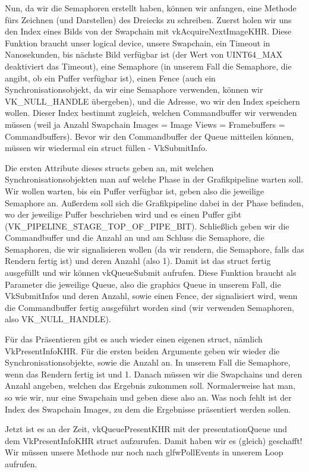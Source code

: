 \documentclass[11pt,a4paper]{report}
\begin{document}
Nun, da wir die Semaphoren erstellt haben, können wir anfangen, eine Methode fürs Zeichnen (und Darstellen) des Dreiecks zu schreiben. Zuerst holen wir uns den Index eines Bilds von der Swapchain mit vkAcquireNextImageKHR. Diese Funktion braucht unser logical device, unsere Swapchain, ein Timeout in Nanosekunden, bis nächste Bild verfügbar ist (der Wert von UINT64\_MAX deaktiviert das Timeout), eine Semaphore (in unserem Fall die Semaphore, die angibt, ob ein Puffer verfügbar ist), einen Fence (auch ein Synchronisationsobjekt, da wir eine Semaphore verwenden, können wir VK\_NULL\_HANDLE übergeben), und die Adresse, wo wir den Index speichern wollen. Dieser Index bestimmt zugleich, welchen Commandbuffer wir verwenden müssen (weil ja Anzahl Swapchain Images = Image Views = Framebuffers = Commandbuffers). Bevor wir den Commandbuffer der Queue mitteilen können, müssen wir wiedermal ein struct füllen - VkSubmitInfo.

Die ersten Attribute dieses structs geben an, mit welchen Synchronisationsobjekten man auf welche Phase in der Grafikpipeline warten soll. Wir wollen warten, bis ein Puffer verfügbar ist, geben also die jeweilige Semaphore an. Außerdem soll sich die Grafikpipeline dabei in der Phase befinden, wo der jeweilige Puffer beschrieben wird und es einen Puffer gibt (VK\_PIPELINE\_STAGE\_TOP\_OF\_PIPE\_BIT). Schließlich geben wir die Commandbuffer und die Anzahl an und am Schluss die Semaphore, die Semaphoren, die wir signalisieren wollen (da wir rendern, die Semaphore, falls das Rendern fertig ist) und deren Anzahl (also 1). Damit ist das struct fertig ausgefüllt und wir können vkQueueSubmit aufrufen. Diese Funktion braucht als Parameter die jeweilige Queue, also die graphics Queue in unserem Fall, die VkSubmitInfos und deren Anzahl, sowie einen Fence, der signalisiert wird, wenn die Commandbuffer fertig ausgeführt worden sind (wir verwenden Semaphoren, also VK\_NULL\_HANDLE).

Für das Präsentieren gibt es auch wieder einen eigenen struct, nämlich VkPresentInfoKHR. Für die ersten beiden Argumente geben wir wieder die Synchronisationsobjekte, sowie die Anzahl an. In unserem Fall die Semaphore, wenn das Rendern fertig ist und 1. Danach müssen wir die Swapchains und deren Anzahl angeben, welchen das Ergebnis zukommen soll. Normalerweise hat man, so wie wir, nur eine Swapchain und geben diese also an. Was noch fehlt ist der Index des Swapchain Images, zu dem die Ergebnisse präsentiert werden sollen.

Jetzt ist es an der Zeit, vkQueuePresentKHR mit der presentationQueue und dem VkPresentInfoKHR struct aufzurufen. Damit haben wir es (gleich) geschafft! Wir müssen unsere Methode nur noch nach glfwPollEvents in unserem Loop aufrufen.
\end{document}
